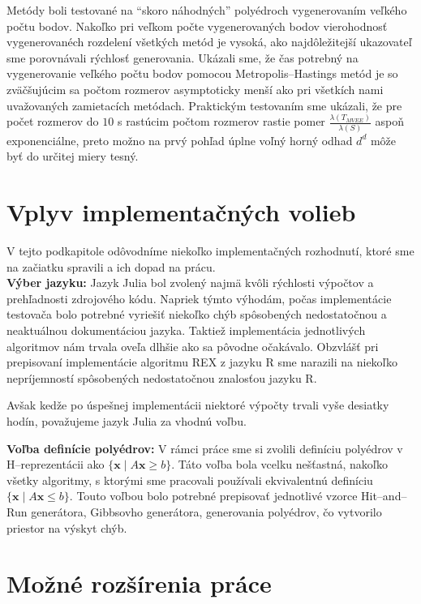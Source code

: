 Metódy boli testované na ``skoro náhodných'' polyédroch vygenerovaním veľkého počtu bodov. Nakoľko pri veľkom počte vygenerovaných bodov vierohodnosť vygenerovanéch rozdelení všetkých metód je vysoká, ako najdôležitejší ukazovateľ sme porovnávali rýchlosť generovania.
Ukázali sme, že čas potrebný na vygenerovanie veľkého počtu bodov pomocou Metropolis--Hastings metód je so zväčšujúcim sa počtom rozmerov asymptoticky menší ako  pri všetkích nami uvažovaných zamietacích metódach. 
Praktickým testovaním sme ukázali, že pre počet rozmerov do $10$ s rastúcim počtom rozmerov rastie pomer $\frac{\lambda(T_{MVEE})}{\lambda(S)}$ aspoň exponenciálne, preto možno na prvý pohľad úplne voľný horný odhad $d^d$ môže byť do určitej miery tesný.

\section{Vplyv implementačných volieb}

V tejto podkapitole odôvodníme niekoľko implementačných rozhodnutí, ktoré sme na začiatku spravili a ich dopad na prácu.\\

\textbf{Výber jazyku:} Jazyk Julia bol zvolený najmä kvôli rýchlosti výpočtov a prehľadnosti zdrojového kódu. Napriek týmto výhodám, počas implementácie testovača bolo potrebné vyriešiť niekoľko chýb spôsobených nedostatočnou a neaktuálnou dokumentáciou jazyka. Taktiež implementácia jednotlivých algoritmov nám trvala oveľa dlhšie ako sa pôvodne očakávalo. Obzvlášť pri prepisovaní implementácie algoritmu REX z jazyku R \cite{rex_harman} sme narazili na niekoľko nepríjemností spôsobených nedostatočnou znalosťou jazyku R.

Avšak kedže po úspešnej implementácii niektoré výpočty trvali vyše desiatky hodín, považujeme jazyk Julia za vhodnú voľbu.

\textbf{Voľba definície polyédrov:} V rámci práce sme si zvolili definíciu polyédrov v H--reprezentácii ako $\{ \mathbf x \; | \; A \mathbf x \geq b \}$. Táto voľba bola vcelku nešťastná, nakoľko všetky algoritmy, s ktorými sme pracovali používali ekvivalentnú definíciu $\{ \mathbf x \; | \; A \mathbf x \leq b \}$. Touto voľbou bolo potrebné prepisovať jednotlivé vzorce Hit--and--Run generátora, Gibbsovho generátora, generovania polyédrov, čo vytvorilo priestor na výskyt chýb.

\section{Možné rozšírenia práce}

